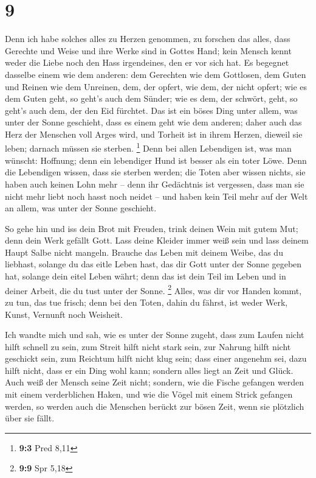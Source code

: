 \hypertarget{section-3}{%
\section{9}\label{section-3}}

 Denn ich habe solches alles zu Herzen genommen, zu forschen
das alles, dass Gerechte und Weise und ihre Werke sind in Gottes Hand;
kein Mensch kennt weder die Liebe noch den Hass irgendeines, den er vor
sich hat.  Es begegnet dasselbe einem wie dem anderen: dem
Gerechten wie dem Gottlosen, dem Guten und Reinen wie dem Unreinen, dem,
der opfert, wie dem, der nicht opfert; wie es dem Guten geht, so geht's
auch dem Sünder; wie es dem, der schwört, geht, so geht's auch dem, der
den Eid fürchtet.  Das ist ein böses Ding unter allem, was
unter der Sonne geschieht, dass es einem geht wie dem anderen; daher
auch das Herz der Menschen voll Arges wird, und Torheit ist in ihrem
Herzen, dieweil sie leben; darnach müssen sie sterben. \footnote{\textbf{9:3}
  Pred 8,11}  Denn bei allen Lebendigen ist, was man
wünscht: Hoffnung; denn ein lebendiger Hund ist besser als ein toter
Löwe.  Denn die Lebendigen wissen, dass sie sterben werden;
die Toten aber wissen nichts, sie haben auch keinen Lohn mehr -- denn
ihr Gedächtnis ist vergessen,  dass man sie nicht mehr liebt
noch hasst noch neidet -- und haben kein Teil mehr auf der Welt an
allem, was unter der Sonne geschieht.

 So gehe hin und iss dein Brot mit Freuden, trink deinen
Wein mit gutem Mut; denn dein Werk gefällt Gott.  Lass deine
Kleider immer weiß sein und lass deinem Haupt Salbe nicht mangeln.
 Brauche das Leben mit deinem Weibe, das du liebhast,
solange du das eitle Leben hast, das dir Gott unter der Sonne gegeben
hat, solange dein eitel Leben währt; denn das ist dein Teil im Leben und
in deiner Arbeit, die du tust unter der Sonne. \footnote{\textbf{9:9}
  Spr 5,18}  Alles, was dir vor Handen kommt, zu tun, das
tue frisch; denn bei den Toten, dahin du fährst, ist weder Werk, Kunst,
Vernunft noch Weisheit.

 Ich wandte mich und sah, wie es unter der Sonne zugeht,
dass zum Laufen nicht hilft schnell zu sein, zum Streit hilft nicht
stark sein, zur Nahrung hilft nicht geschickt sein, zum Reichtum hilft
nicht klug sein; dass einer angenehm sei, dazu hilft nicht, dass er ein
Ding wohl kann; sondern alles liegt an Zeit und Glück. 
Auch weiß der Mensch seine Zeit nicht; sondern, wie die Fische gefangen
werden mit einem verderblichen Haken, und wie die Vögel mit einem Strick
gefangen werden, so werden auch die Menschen berückt zur bösen Zeit,
wenn sie plötzlich über sie fällt.

